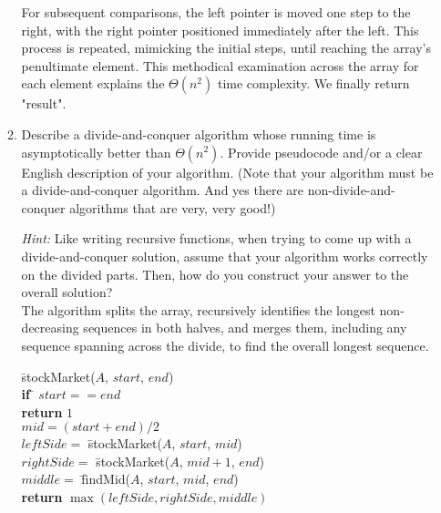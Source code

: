 \documentclass[11pt]{article}
\begin{document}
\begin{enumerate}
\begin{enumerate}
For subsequent comparisons, the left pointer is moved one step to the right, with the right pointer positioned immediately after the left. This process is repeated, mimicking the initial steps, until reaching the array's penultimate element. This methodical examination across the array for each element explains the $\Theta(n^2)$ time complexity. We finally return "result".

\pagebreak
\item Describe a divide-and-conquer algorithm whose running time is
  asymptotically better than $\Theta(n^{2})$.  Provide pseudocode
  and/or a clear English description of your algorithm.  (Note that
  your algorithm must be a divide-and-conquer algorithm.  And yes there
  are non-divide-and-conquer algorithms that are very, very good!)
  
  \emph{Hint:} Like writing recursive functions, when trying to come up with a divide-and-conquer solution, assume that your algorithm works
  correctly on the divided parts.  Then, how do you construct your answer to the overall solution? \\ 

The algorithm splits the array, recursively identifies the longest non-decreasing sequences in both halves, and merges them, including any sequence spanning across the divide, to find the overall longest sequence.






\begin{tabbing}
\hspace*{1cm} \= stockMarket($A$, $start$, $end$) \\
\> \hspace*{.5cm} \= {\bf if} \= $start == end$ \\
\>\>\> {\bf return} $1$ \\
\>\> $mid = (start + end) / 2$ \\
\>\> $leftSide = $ \= stockMarket($A$, $start$, $mid$) \\
\>\> $rightSide = $ \= stockMarket($A$, $mid + 1$, $end$) \\
\>\> $middle = $ \= findMid($A$, $start$, $mid$, $end$) \\
\>\> {\bf return} $\max(leftSide, rightSide, middle)$ \\
\end{tabbing}


\end{enumerate}
\end{enumerate}
\end{document}
